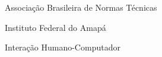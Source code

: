 \begin{siglas}
  \item[ABNT] Associação Brasileira de Normas Técnicas
  \item[IFAP] Instituto Federal do Amapá
	\item[IHC] Interação Humano-Computador
\end{siglas}